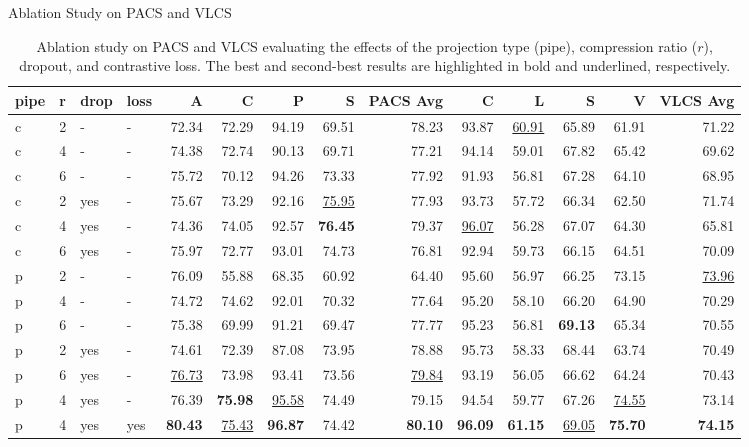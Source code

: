 \documentclass[t, aspectratio=169]{beamer} %
\begin{document}
	\begin{frame}{Ablation Study on PACS and VLCS}
\begin{table}[htbp]
\centering
\caption{Ablation study on PACS and VLCS evaluating the effects of the projection type (pipe), compression ratio ($r$), dropout, and contrastive loss. The best and second-best results are highlighted in bold and underlined, respectively.}
\tiny
\begin{adjustbox}{max width=\textwidth,max totalheight=0.75\textheight,keepaspectratio}
\begin{tabular}{llllrrrrrrrrrr}
\toprule
pipe & r & drop & loss & A & C & P & S & \textbf{PACS Avg} & C & L & S & V & \textbf{VLCS Avg} \\
\midrule
c & 2 & - & - & 72.34 & 72.29 & 94.19 & 69.51 & 78.23 & 93.87 & \underline{60.91} & 65.89 & 61.91 & 71.22 \\
c & 4 & - & - & 74.38 & 72.74 & 90.13 & 69.71 & 77.21 & 94.14 & 59.01 & 67.82 & 65.42 & 69.62 \\
c & 6 & - & - & 75.72 & 70.12 & 94.26 & 73.33 & 77.92 & 91.93 & 56.81 & 67.28 & 64.10 & 68.95 \\
c & 2 & yes & - & 75.67 & 73.29 & 92.16 & \underline{75.95} & 77.93 & 93.73 & 57.72 & 66.34 & 62.50 & 71.74 \\
c & 4 & yes & - & 74.36 & 74.05 & 92.57 & \textbf{76.45} & 79.37 & \underline{96.07} & 56.28 & 67.07 & 64.30 & 65.81 \\
c & 6 & yes & - & 75.97 & 72.77 & 93.01 & 74.73 & 76.81 & 92.94 & 59.73 & 66.15 & 64.51 & 70.09 \\
p & 2 & - & - & 76.09 & 55.88 & 68.35 & 60.92 & 64.40 & 95.60 & 56.97 & 66.25 & 73.15 & \underline{73.96} \\
p & 4 & - & - & 74.72 & 74.62 & 92.01 & 70.32 & 77.64 & 95.20 & 58.10 & 66.20 & 64.90 & 70.29 \\
p & 6 & - & - & 75.38 & 69.99 & 91.21 & 69.47 & 77.77 & 95.23 & 56.81 & \textbf{69.13} & 65.34 & 70.55 \\
p & 2 & yes & - & 74.61 & 72.39 & 87.08 & 73.95 & 78.88 & 95.73 & 58.33 & 68.44 & 63.74 & 70.49 \\
p & 6 & yes & - & \underline{76.73} & 73.98 & 93.41 & 73.56 & \underline{79.84} & 93.19 & 56.05 & 66.62 & 64.24 & 70.43 \\
p & 4 & yes & - & 76.39 & \textbf{75.98} & \underline{95.58} & 74.49 & 79.15 & 94.54 & 59.77 & 67.26 & \underline{74.55} & 73.14 \\
p & 4 & yes & yes & \textbf{80.43} & \underline{75.43} & \textbf{96.87} & 74.42 & \textbf{80.10} & \textbf{96.09} & \textbf{61.15} & \underline{69.05} & \textbf{75.70} & \textbf{74.15} \\
\bottomrule
\end{tabular}
\end{adjustbox}
\end{table}
	\end{frame}
\end{document}
